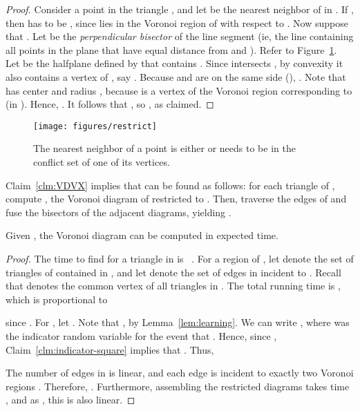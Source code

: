 \documentclass{siamltex}
\begin{document}
\begin{proof}
Consider a point  in the triangle , and let  be
the nearest neighbor of  in . If , then
 has to be , since  lies in the Voronoi region of 
with respect to . Now suppose that . 
Let  be the \emph{perpendicular bisector} of the line 
segment  (ie, the line
containing all points in the plane that have equal distance from
 and ). Refer to Figure~\ref{fig:nbr}. Let  be the halfplane 
defined by  that contains . Since  intersects , by 
convexity it also contains a vertex of , say . Because  
and  are on the same side (),
.
Note that  has center  and radius , because
 is a vertex of the Voronoi region corresponding
to  (in ).
Hence, .
It follows that , so 
, as claimed.
\end{proof}
\medskip
\begin{figure}
\begin{center}
\texttt{[image: figures/restrict]}
\end{center}
\caption{The nearest neighbor of a point  is either
 or needs to be in the conflict set of one of its vertices.} \label{fig:nbr}
\end{figure}

Claim~\ref{clm:VDVX} implies that  can be found
as follows: for each triangle  of , compute 
, the Voronoi diagram of  restricted to . 
Then, traverse the edges of  and fuse the bisectors of the
adjacent diagrams, yielding .
\begin{lemma}
Given , the Voronoi diagram  can be 
computed in expected  time.
\end{lemma}

\begin{proof}
The time to find  for a triangle 
  in  is 
~\cite[Chapter~7]{deBergKrOvSc00}. 
For a region  of 
, let  denote the set of triangles of  contained
in , and let  denote the set of edges in  
incident to . 
Recall that  denotes the common vertex of all triangles in
. The total running time is
, which is
proportional to

since . 
For , let .
Note that , by Lemma~\ref{lem:learning}.
We can write ,
where  was the indicator random variable for the event
that .
Hence, since ,
Claim~\ref{clm:indicator-square} implies that .
Thus,



The number of edges in  is linear, and each edge 
is incident to exactly two Voronoi regions .
Therefore, .
Furthermore, assembling the restricted diagrams takes time 
, and as
, this is also linear.  
\end{proof}
\end{document}
